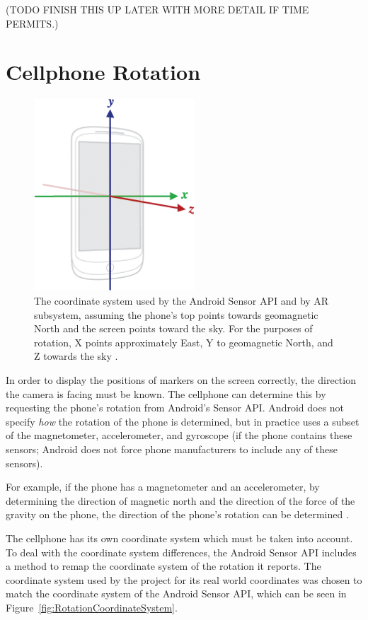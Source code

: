 (TODO FINISH THIS UP LATER WITH MORE DETAIL IF TIME PERMITS.)

\section{Cellphone Rotation}
\begin{figure}
	\centering
	\includegraphics[width=6cm]{Figures/AxisDevice.png}
	\decoRule
	\caption{The coordinate system used by the Android Sensor API \cite{AndroidSensorDocsOverview} and by AR subsystem, assuming the phone's top points towards geomagnetic North and the screen points toward the sky. For the purposes of rotation, X points approximately East, Y to geomagnetic North, and Z towards the sky \cite{AndroidSensorDocs}.}
	\label{fig:CameraLens}
\end{figure}

In order to display the positions of markers on the screen correctly, the direction the camera is facing must be known. The cellphone can determine this by requesting the phone's rotation from Android's Sensor API. Android does not specify \emph{how} the rotation of the phone is determined, but in practice uses a subset of the magnetometer, accelerometer, and gyroscope (if the phone contains these sensors; Android does not force phone manufacturers to include any of these sensors). 

For example, if the phone has a magnetometer and an accelerometer, by determining the direction of magnetic north and the direction of the force of the gravity on the phone, the direction of the phone's rotation can be determined \cite{AndroidSensorDocs}.

The cellphone has its own coordinate system which must be taken into account. To deal with the coordinate system differences, the Android Sensor API includes a method to remap the coordinate system of the rotation it reports. The coordinate system used by the project for its real world coordinates was chosen to match the coordinate system of the Android Sensor API, which can be seen in Figure~\ref{fig:RotationCoordinateSystem}.


